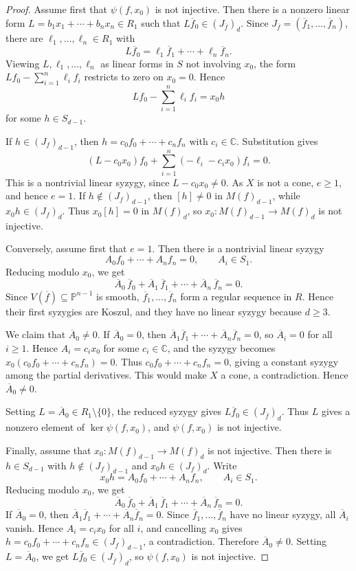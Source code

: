 \documentclass[11pt]{amsart}
\theoremstyle{plain}
\theoremstyle{definition}
\numberwithin{equation}{section}
\newcommand{\C}{\mathbb{C}}
\newcommand{\PP}{\mathbb{P}}
\begin{document}
\begin{proof}
Assume first that $\psi(f,x_0)$ is not injective. Then there is a nonzero
linear form $L=b_1x_1+\cdots+b_nx_n\in R_1$ such that
$L\overline f_0\in (J_{\overline f})_d$. Since
$J_{\overline f}=(\overline f_1,\ldots,\overline f_n)$, there are
$\ell_1,\ldots,\ell_n\in R_1$ with
\[
L\overline f_0=\ell_1\overline f_1+\cdots+\ell_n\overline f_n.
\]
Viewing $L,\ell_1,\ldots,\ell_n$ as linear forms in $S$ not involving $x_0$,
the form $Lf_0-\sum_{i=1}^n\ell_if_i$ restricts to zero on $x_0=0$. Hence
\[
Lf_0-\sum_{i=1}^n\ell_if_i=x_0h
\]
for some $h\in S_{d-1}$.

If $h\in (J_f)_{d-1}$, then $h=c_0f_0+\cdots+c_nf_n$ with $c_i\in\C$.
Substitution gives
\[
(L-c_0x_0)f_0+\sum_{i=1}^n(-\ell_i-c_ix_0)f_i=0.
\]
This is a nontrivial linear syzygy, since $L-c_0x_0\neq0$. As $X$ is not a
cone, $e\geq1$, and hence $e=1$. If $h\notin (J_f)_{d-1}$, then
$[h]\neq0$ in $M(f)_{d-1}$, while $x_0h\in (J_f)_d$. Thus $x_0[h]=0$ in
$M(f)_d$, so $x_0:M(f)_{d-1}\to M(f)_d$ is not injective.

Conversely, assume first that $e=1$. Then there is a nontrivial linear syzygy
\[
A_0f_0+\cdots+A_nf_n=0,\qquad A_i\in S_1.
\]
Reducing modulo $x_0$, we get
\[
\overline A_0\,\overline f_0+
\overline A_1\,\overline f_1+\cdots+\overline A_n\,\overline f_n=0.
\]
Since $V(\overline f)\subseteq\PP^{n-1}$ is smooth,
$\overline f_1,\ldots,\overline f_n$ form a regular sequence in $R$. Hence their
first syzygies are Koszul, and they have no linear syzygy because $d\geq3$.

We claim that $\overline A_0\neq0$. If $\overline A_0=0$, then
$\overline A_1\overline f_1+\cdots+\overline A_n\overline f_n=0$, so
$\overline A_i=0$ for all $i\geq1$. Hence $A_i=c_ix_0$ for some $c_i\in\C$,
and the syzygy becomes $x_0(c_0f_0+\cdots+c_nf_n)=0$. Thus
$c_0f_0+\cdots+c_nf_n=0$, giving a constant syzygy among the partial
derivatives. This would make $X$ a cone, a contradiction. Hence
$\overline A_0\neq0$.

Setting $L=\overline A_0\in R_1\setminus\{0\}$, the reduced syzygy gives
$L\overline f_0\in (J_{\overline f})_d$. Thus $L$ gives a nonzero element of
$\ker\psi(f,x_0)$, and $\psi(f,x_0)$ is not injective.

Finally, assume that $x_0:M(f)_{d-1}\to M(f)_d$ is not injective. Then there is
$h\in S_{d-1}$ with $h\notin (J_f)_{d-1}$ and $x_0h\in (J_f)_d$. Write
\[
x_0h=A_0f_0+\cdots+A_nf_n,\qquad A_i\in S_1.
\]
Reducing modulo $x_0$, we get
\[
\overline A_0\,\overline f_0+
\overline A_1\,\overline f_1+\cdots+\overline A_n\,\overline f_n=0.
\]
If $\overline A_0=0$, then
$\overline A_1\overline f_1+\cdots+\overline A_n\overline f_n=0$. Since
$\overline f_1,\ldots,\overline f_n$ have no linear syzygy, all
$\overline A_i$ vanish. Hence $A_i=c_ix_0$ for all $i$, and cancelling $x_0$
gives $h=c_0f_0+\cdots+c_nf_n\in (J_f)_{d-1}$, a contradiction. Therefore
$\overline A_0\neq0$. Setting $L=\overline A_0$, we get
$L\overline f_0\in (J_{\overline f})_d$, so $\psi(f,x_0)$ is not injective.
\end{proof}
\end{document}

